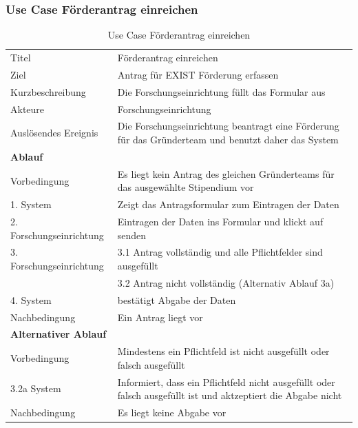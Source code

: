 \documentclass{article}
\begin{document}
\subsubsection{Use Case Förderantrag einreichen}
\begin{table}[htbp]
\centering
\begin{tabularx}{\textwidth}{lX}
\midrule
Titel & Förderantrag einreichen\\
Ziel & Antrag für EXIST Förderung erfassen\\
Kurzbeschreibung & Die Forschungseinrichtung füllt das Formular aus\\
Akteure & Forschungseinrichtung\\
Auslösendes Ereignis & Die Forschungseinrichtung beantragt eine Förderung für das Gründerteam und benutzt daher das System\\
\textbf{Ablauf} \\
Vorbedingung & Es liegt kein Antrag des gleichen Gründerteams für das ausgewählte Stipendium vor\\
\hspace{0.5cm} 1. System & Zeigt das Antragsformular zum Eintragen der Daten\\
\hspace{0.5cm} 2. Forschungseinrichtung & Eintragen der Daten ins Formular und klickt auf senden\\
\hspace{0.5cm} 3. Forschungseinrichtung & 3.1 Antrag vollständig und alle Pflichtfelder sind ausgefüllt\\
& 3.2 Antrag nicht vollständig (Alternativ Ablauf 3a)\\
\hspace{0.5cm} 4. System & bestätigt Abgabe der Daten \\
Nachbedingung & Ein Antrag liegt vor\\
\textbf{Alternativer Ablauf}\\
Vorbedingung & Mindestens ein Pflichtfeld ist nicht ausgefüllt oder falsch ausgefüllt\\
\hspace{0.5cm} 3.2a System & Informiert, dass ein Pflichtfeld nicht ausgefüllt oder falsch ausgefüllt ist und aktzeptiert die Abgabe nicht \\
Nachbedingung & Es liegt keine Abgabe vor\\
\bottomrule
\end{tabularx}
\caption{Use Case Förderantrag einreichen}
\end{table}
\end{document}
